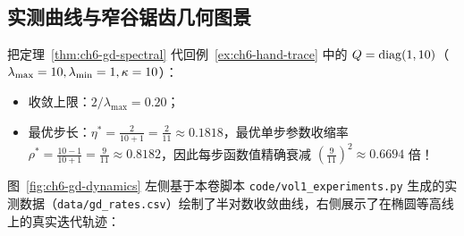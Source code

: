 \subsection{实测曲线与窄谷锯齿几何图景}

把定理~\ref{thm:ch6-gd-spectral} 代回例~\ref{ex:ch6-hand-trace} 中的 $Q = \operatorname{diag}(1, 10)$（$\lambda_{\max}=10, \lambda_{\min}=1, \kappa=10$）：
\begin{itemize}
  \item 收敛上限：$2/\lambda_{\max} = 0.20$；
  \item 最优步长：$\eta^* = \frac{2}{10+1} = \frac{2}{11} \approx 0.1818$，最优单步参数收缩率 $\rho^* = \frac{10-1}{10+1} = \frac{9}{11} \approx 0.8182$，因此每步函数值精确衰减 $(\frac{9}{11})^2 \approx 0.6694$ 倍！
\end{itemize}

图~\ref{fig:ch6-gd-dynamics} 左侧基于本卷脚本 \texttt{code/vol1\_experiments.py} 生成的实测数据（\texttt{data/gd\_rates.csv}）绘制了半对数收敛曲线，右侧展示了在椭圆等高线上的真实迭代轨迹：

